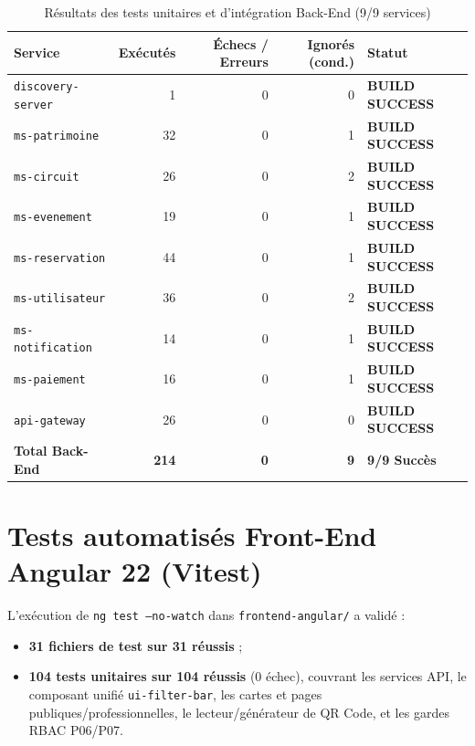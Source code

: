 \documentclass[12pt,a4paper]{report}
\begin{document}
\begin{table}[H]
\centering
\caption{Résultats des tests unitaires et d'intégration Back-End (9/9 services)}
\label{tab:backend-tests}
\begin{tabular}{@{}l r r r l@{}}
\toprule
\textbf{Service} & \textbf{Exécutés} & \textbf{Échecs / Erreurs} & \textbf{Ignorés (cond.)} & \textbf{Statut} \\
\midrule
\texttt{discovery-server} & 1 & 0 & 0 & \textbf{BUILD SUCCESS} \\
\texttt{ms-patrimoine} & 32 & 0 & 1 & \textbf{BUILD SUCCESS} \\
\texttt{ms-circuit} & 26 & 0 & 2 & \textbf{BUILD SUCCESS} \\
\texttt{ms-evenement} & 19 & 0 & 1 & \textbf{BUILD SUCCESS} \\
\texttt{ms-reservation} & 44 & 0 & 1 & \textbf{BUILD SUCCESS} \\
\texttt{ms-utilisateur} & 36 & 0 & 2 & \textbf{BUILD SUCCESS} \\
\texttt{ms-notification} & 14 & 0 & 1 & \textbf{BUILD SUCCESS} \\
\texttt{ms-paiement} & 16 & 0 & 1 & \textbf{BUILD SUCCESS} \\
\texttt{api-gateway} & 26 & 0 & 0 & \textbf{BUILD SUCCESS} \\
\midrule
\textbf{Total Back-End} & \textbf{214} & \textbf{0} & \textbf{9} & \textbf{9/9 Succès} \\
\bottomrule
\end{tabular}
\end{table}

\section{Tests automatisés Front-End Angular 22 (Vitest)}
L'exécution de \texttt{ng test --no-watch} dans \texttt{frontend-angular/} a validé :
\begin{itemize}
    \item \textbf{31 fichiers de test sur 31 réussis} ;
    \item \textbf{104 tests unitaires sur 104 réussis} (0 échec), couvrant les services API, le composant unifié \texttt{ui-filter-bar}, les cartes et pages publiques/professionnelles, le lecteur/générateur de QR Code, et les gardes RBAC P06/P07.
\end{itemize}
\end{document}
